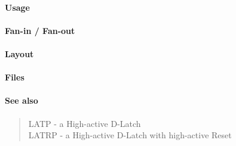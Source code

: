 \paragraph{Usage}

\paragraph{Fan-in / Fan-out}

\paragraph{Layout}

\paragraph{Files}

\paragraph{See also}
\begin{quote}
    LATP - a High-active D-Latch \\
    LATRP - a High-active D-Latch with high-active Reset
\end{quote}
